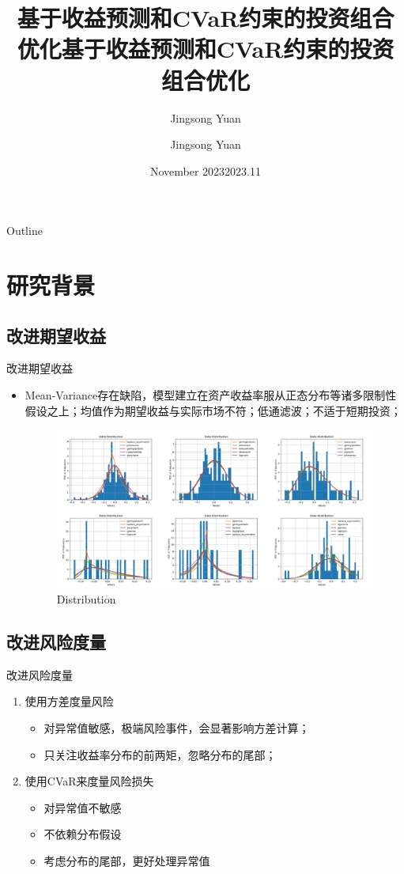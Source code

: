 \documentclass[CJK,aspectratio=43]{beamer}  %
\title{基于收益预测和CVaR约束的投资组合优化}
\author{Jingsong Yuan}
\date{November 2023}
\begin{document}
	\begin{frame}
		\title{基于收益预测和CVaR约束的投资组合优化}
		\author{Jingsong Yuan} %
		\date{2023.11}  %
		\titlepage
	\end{frame}
	\begin{frame}{Outline}
	\end{frame}
\section{研究背景}
\subsection{改进期望收益}
	\begin{frame}{改进期望收益}
			\begin{itemize}
				\item Mean-Variance存在缺陷，模型建立在资产收益率服从正态分布等诸多限制性假设之上；均值作为期望收益与实际市场不符；低通滤波；不适于短期投资；
			\begin{figure}
				\centering
				\includegraphics[width=0.9\linewidth]{"pic/distribution of random six"}
				\caption{Distribution}
				\label{fig:distribution-of-random-stock}
			\end{figure}
			\end{itemize}
	\end{frame}
\subsection{改进风险度量}
	\begin{frame}{改进风险度量}
		\begin{enumerate}
			\item 使用方差度量风险
			\begin{itemize}
				\item 对异常值敏感，极端风险事件，会显著影响方差计算；
				\item 只关注收益率分布的前两矩，忽略分布的尾部；
			\end{itemize}
			\item 使用CVaR来度量风险损失
			\begin{itemize}
				\item 对异常值不敏感
				\item 不依赖分布假设
				\item 考虑分布的尾部，更好处理异常值
			\end{itemize}
		\end{enumerate}
	\end{frame}
\end{document}
